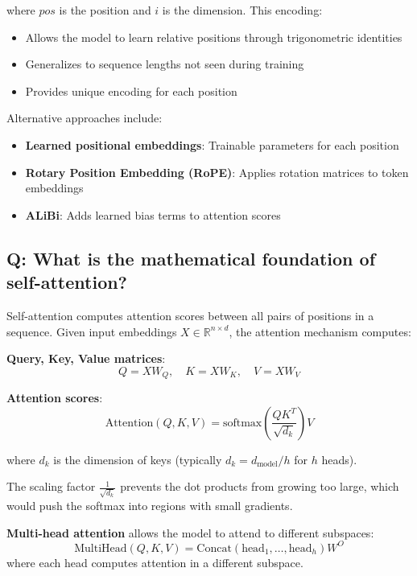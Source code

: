where \(pos\) is the position and \(i\) is the dimension. This encoding:
\begin{itemize}
	\item Allows the model to learn relative positions through trigonometric identities
	\item Generalizes to sequence lengths not seen during training
	\item Provides unique encoding for each position
\end{itemize}

Alternative approaches include:
\begin{itemize}
	\item \textbf{Learned positional embeddings}: Trainable parameters for each position
	\item \textbf{Rotary Position Embedding (RoPE)}: Applies rotation matrices to token embeddings
	\item \textbf{ALiBi}: Adds learned bias terms to attention scores
\end{itemize}

\subsection*{Q: What is the mathematical foundation of self-attention?}
Self-attention computes attention scores between all pairs of positions in a sequence. Given input embeddings \(X \in \mathbb{R}^{n \times d}\), the attention mechanism computes:

\textbf{Query, Key, Value matrices}:
\[
	Q = XW_Q, \quad K = XW_K, \quad V = XW_V
\]

\textbf{Attention scores}:
\[
	\text{Attention}(Q, K, V) = \text{softmax}\left(\frac{QK^T}{\sqrt{d_k}}\right)V
\]

where \(d_k\) is the dimension of keys (typically \(d_k = d_{\text{model}}/h\) for \(h\) heads).

The scaling factor \(\frac{1}{\sqrt{d_k}}\) prevents the dot products from growing too large, which would push the softmax into regions with small gradients.

\textbf{Multi-head attention} allows the model to attend to different subspaces:
\[
	\text{MultiHead}(Q, K, V) = \text{Concat}(\text{head}_1, \ldots, \text{head}_h)W^O
\]
where each head computes attention in a different subspace.

